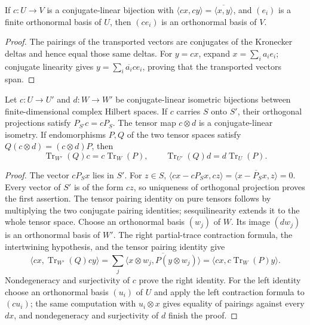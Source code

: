 \begin{lemma}
\label{lem:conjugate-orthonormal-basis}
\leanok
If $c:U\to V$ is a conjugate-linear bijection with
$\langle cx,cy\rangle=\overline{\langle x,y\rangle}$, and $(e_i)$ is
a finite orthonormal basis of $U$, then $(ce_i)$ is an orthonormal basis
of $V$.
\end{lemma}
\begin{proof}
The pairings of the transported vectors are conjugates of the Kronecker
deltas and hence equal those same deltas. For $y=cx$, expand
$x=\sum_i a_i e_i$; conjugate linearity gives
$y=\sum_i\overline{a_i}ce_i$, proving that the transported vectors span.
\end{proof}

\begin{lemma}
\label{lem:conjugate-projection-partial-trace}
\leanok
Let $c:U\to U'$ and $d:W\to W'$ be conjugate-linear isometric bijections
between finite-dimensional complex Hilbert spaces. If $c$ carries $S$
onto $S'$, their orthogonal projections satisfy $P_{S'}c=cP_S$.
The tensor map $c\otimes d$ is a conjugate-linear isometry.
If endomorphisms $P,Q$ of the two tensor spaces satisfy
$Q(c\otimes d)=(c\otimes d)P$, then
\[
 \operatorname{Tr}_{W'}(Q)c=c\operatorname{Tr}_W(P),\qquad
 \operatorname{Tr}_{U'}(Q)d=d\operatorname{Tr}_U(P).
\]
\end{lemma}
\begin{proof}
The vector $cP_Sx$ lies in $S'$. For $z\in S$,
$\langle cx-cP_Sx,cz\rangle=\overline{\langle x-P_Sx,z\rangle}=0$.
Every vector of $S'$ is of the form $cz$, so uniqueness of orthogonal
projection proves the first assertion. The tensor pairing identity on
pure tensors follows by multiplying the two conjugate pairing
identities; sesquilinearity extends it to the whole tensor space.
Choose an orthonormal basis $(w_j)$ of $W$. Its image $(dw_j)$ is an
orthonormal basis of $W'$. The right partial-trace contraction formula,
the intertwining hypothesis, and the tensor pairing identity give
\[
 \langle cx,\operatorname{Tr}_{W'}(Q)cy\rangle
 =\sum_j\overline{\langle x\otimes w_j,P(y\otimes w_j)\rangle}
 =\langle cx,c\operatorname{Tr}_W(P)y\rangle.
\]
Nondegeneracy and surjectivity of $c$ prove the right identity.
For the left identity choose an orthonormal basis $(u_i)$ of $U$ and
apply the left contraction formula to $(cu_i)$; the same computation
with $u_i\otimes x$ gives equality of pairings against every $dx$,
and nondegeneracy and surjectivity of $d$ finish the proof.
\end{proof}

